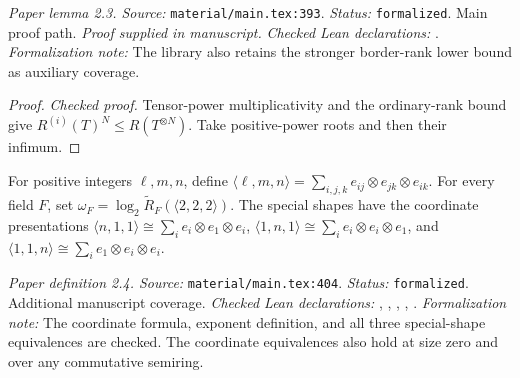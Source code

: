 \noindent\textit{Paper lemma 2.3. Source:} \texttt{material/main.tex:393}.
\textit{Status:} \texttt{formalized}. Main proof path.
\textit{Proof supplied in manuscript.}
\textit{Checked Lean declarations:} .
\textit{Formalization note:} The library also retains the stronger border-rank lower bound as auxiliary coverage.

\begin{proof}
\leanok
{}
\textit{Checked proof.} Tensor-power multiplicativity and the ordinary-rank bound give $R^{(i)}(T)^N\le R(T^{\otimes N})$. Take positive-power roots and then their infimum.
\end{proof}

\renewcommand{\thetheorem}{2.4}
\begin{definition}
\label{def:matrix-multiplication}
\leanok
{}
For positive integers $\ell,m,n$, define $\langle\ell,m,n\rangle=\sum_{i,j,k}e_{ij}\otimes e_{jk}\otimes e_{ik}$. For every field $F$, set $\omega_F=\log_2\widetilde R_F(\langle2,2,2\rangle)$. The special shapes have the coordinate presentations $\langle n,1,1\rangle\cong\sum_i e_i\otimes e_1\otimes e_i$, $\langle1,n,1\rangle\cong\sum_i e_i\otimes e_i\otimes e_1$, and $\langle1,1,n\rangle\cong\sum_i e_1\otimes e_i\otimes e_i$.
\end{definition}

\noindent\textit{Paper definition 2.4. Source:} \texttt{material/main.tex:404}.
\textit{Status:} \texttt{formalized}. Additional manuscript coverage.
\textit{Checked Lean declarations:} , , , , .
\textit{Formalization note:} The coordinate formula, exponent definition, and all three special-shape equivalences are checked. The coordinate equivalences also hold at size zero and over any commutative semiring.


